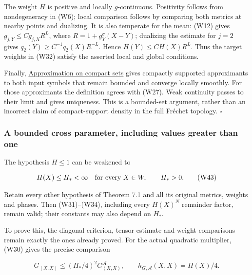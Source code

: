 \documentclass[
  11pt,
]{article}
\begin{document}
The weight \(H\) is positive and locally \(g\)-continuous. Positivity
follows from nondegeneracy in (W6); local comparison follows by
comparing both metrics at nearby points and dualizing. It is also
temperate for the mean: (W12) gives \(g_{j,Y}\leq Cg_{j,X}R^L\), where
\(R=1+g_Y^\sigma(X-Y)\); dualizing the estimate for \(j=2\) gives
\(q_2(Y)\geq C^{-1}q_2(X)R^{-L}\). Hence \(H(Y)\leq CH(X)R^L\). Thus the
target weights in (W32) satisfy the asserted local and global
conditions.

Finally,
\href{metric-localization.pdf\#section*.28}{Approximation
on compact sets} gives compactly supported approximants to both input
symbols that remain bounded and converge locally smoothly. For those
approximants the definition agrees with (W27). Weak continuity passes to
their limit and gives uniqueness. This is a bounded-set argument, rather
than an incorrect claim of compact-support density in the full Fréchet
topology. \(\square\)

\subsubsection{A bounded cross parameter, including values greater than
one}\label{a-bounded-cross-parameter-including-values-greater-than-one}

The hypothesis \(H\leq1\) can be weakened to

\[
 H(X)\leq H_*<\infty\quad\hbox{for every }X\in W,
 \qquad H_*>0.
 \tag{W43}
\]

Retain every other hypothesis of Theorem 7.1 and all its original
metrics, weights and phases. Then (W31)--(W34), including every
\(H(X)^N\) remainder factor, remain valid; their constants may also
depend on \(H_*\).

To prove this, the diagonal criterion, tensor estimate and weight
comparisons remain exactly the ones already proved. For the actual
quadratic multiplier, (W30) gives the precise comparison

\[
 G_{(X,X)}\leq (H_*/4)^2G_{(X,X)}^{\mathcal A},\qquad
 h_{G,\mathcal A}(X,X)=H(X)/4.
 \tag{W44}
\]
\end{document}
